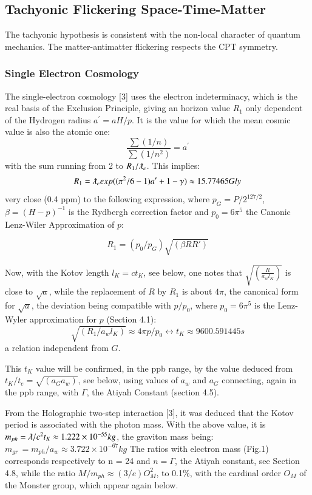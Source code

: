 \documentclass[twoside,draft]{article}
\begin{document}
\begin{sloppypar}
{\subsection{Tachyonic Flickering Space-Time-Matter}

The tachyonic hypothesis is consistent with the non-local character of quantum mechanics. The
matter-antimatter flickering respects the CPT symmetry.

\subsubsection{Single Electron Cosmology}

The single-electron cosmology [3] uses the electron indeterminacy, which is the real basis of the
Exclusion Principle, giving an horizon value $R_1$ only dependent of the Hydrogen radius $a^{\prime} = aH/p$. It
is the value for which the mean cosmic value is also the atomic one:
\begin{equation}
\frac{\sum(1/n)}{\sum(1/n^{2})} = a^{\prime}
\end{equation}
with the sum running from 2 to $R_{1} /\lambdabar_{e}$. This implies:
$$R_{1} = \lambdabar_{e} exp((\pi^{2} /6 - 1)a^{\prime} + 1 - \gamma) \approx 15.77465  Gly$$
very close (0.4 ppm) to the following expression, where $p_{G} = P/2^{127/2}$, $\beta = (H - p)^{-1}$ is the
Rydbergh correction factor and $p_{0} = 6\pi^{5}$ the Canonic Lenz-Wiler Approximation of $p$:

$$R_{1} = ( p_{0} /p_{G} ) \sqrt{(\beta R R\prime)}$$

Now, with the Kotov length $l_{K} = ct_{K}$, see below, one notes that $\sqrt{(\frac{R}{a_{w} l_{K}})}$ is close to $\sqrt{a}$, while
the replacement of $R$ by $R_{1}$ is about $4\pi$, the canonical form for $\sqrt{a}$, the deviation being compatible
with $p/p_{0}$, where $p_{0} = 6\pi^{5}$ is the Lenz-Wyler approximation for $p$ (Section 4.1):
$$\sqrt{(R_{1} /a_{w} l_{K})} \approx 4\pi p/p_{0} \leftrightarrow t_{K} \approx 9 600.591445 s$$ a relation independent from $G$. 

This $t_K$ value will be confirmed, in the ppb range, by the value
deduced from $t_{K} /t_{e} = \sqrt{(a_{G} a_{w})}$, see below, using values of $a_{w}$ and $a_{G}$ connecting, again in the ppb
range, with $\Gamma$, the Atiyah Constant (section 4.5).

From the Holographic two-step interaction [3], it was deduced that the Kotov period is
associated with the photon mass. With the above value, it is $m_{ph} = \lambdabar/c^{2} t_{K} \approx 1.222 \times 10^{-55} kg$, the graviton mass being: 
$m_{gr}\, = m_{ph} /a_{w} \approx 3.722 \times 10^{-67} kg$
The ratios with electron mass (Fig.1) corresponds respectively to n = 24 and $n = \Gamma$, the Atiyah constant, see Section 4.8, while the ratio $M/m_{ph} \approx (3/e)O^2_M$, to 0.1\%, with the cardinal order $O_M$ of the Monster group, which appear again below. 
}
\end{sloppypar}
\end{document}

